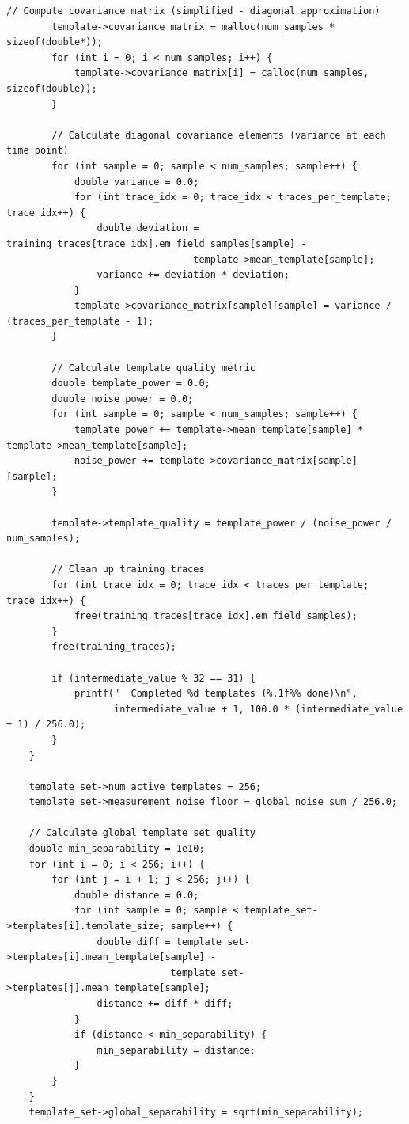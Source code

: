 \documentclass[11pt,a4paper]{article}
\theoremstyle{definition}
\begin{document}
\begin{lstlisting}[caption={Complete EM Template Building Implementation}]
        // Compute covariance matrix (simplified - diagonal approximation)
        template->covariance_matrix = malloc(num_samples * sizeof(double*));
        for (int i = 0; i < num_samples; i++) {
            template->covariance_matrix[i] = calloc(num_samples, sizeof(double));
        }
        
        // Calculate diagonal covariance elements (variance at each time point)
        for (int sample = 0; sample < num_samples; sample++) {
            double variance = 0.0;
            for (int trace_idx = 0; trace_idx < traces_per_template; trace_idx++) {
                double deviation = training_traces[trace_idx].em_field_samples[sample] - 
                                 template->mean_template[sample];
                variance += deviation * deviation;
            }
            template->covariance_matrix[sample][sample] = variance / (traces_per_template - 1);
        }
        
        // Calculate template quality metric
        double template_power = 0.0;
        double noise_power = 0.0;
        for (int sample = 0; sample < num_samples; sample++) {
            template_power += template->mean_template[sample] * template->mean_template[sample];
            noise_power += template->covariance_matrix[sample][sample];
        }
        
        template->template_quality = template_power / (noise_power / num_samples);
        
        // Clean up training traces
        for (int trace_idx = 0; trace_idx < traces_per_template; trace_idx++) {
            free(training_traces[trace_idx].em_field_samples);
        }
        free(training_traces);
        
        if (intermediate_value % 32 == 31) {
            printf("  Completed %d templates (%.1f%% done)\n", 
                   intermediate_value + 1, 100.0 * (intermediate_value + 1) / 256.0);
        }
    }
    
    template_set->num_active_templates = 256;
    template_set->measurement_noise_floor = global_noise_sum / 256.0;
    
    // Calculate global template set quality
    double min_separability = 1e10;
    for (int i = 0; i < 256; i++) {
        for (int j = i + 1; j < 256; j++) {
            double distance = 0.0;
            for (int sample = 0; sample < template_set->templates[i].template_size; sample++) {
                double diff = template_set->templates[i].mean_template[sample] - 
                             template_set->templates[j].mean_template[sample];
                distance += diff * diff;
            }
            if (distance < min_separability) {
                min_separability = distance;
            }
        }
    }
    template_set->global_separability = sqrt(min_separability);
    

\end{lstlisting}
\end{document}
